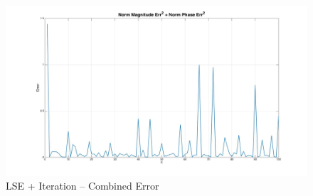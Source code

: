 \begin{figure}[ht!]
\includegraphics[keepaspectratio=true,width=6in]{./figures/regression/levyIter_Err2.jpg}
\centering
\caption{LSE + Iteration -- Combined Error}
\label{fig:levyIter_Err2}
\end{figure}

